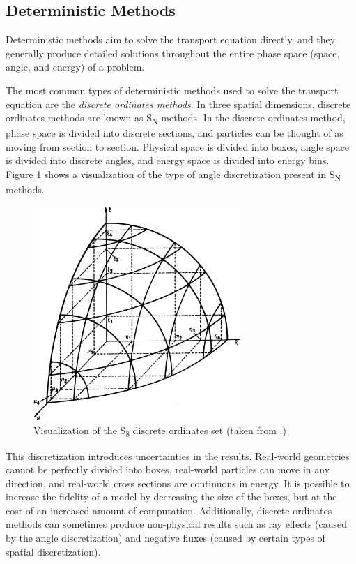\subsection{Deterministic Methods}
\label{sec:bg:rt:determ}

Deterministic methods aim to solve the transport equation directly, and they generally produce detailed solutions throughout the entire phase space (space, angle, and energy) of a problem.

The most common types of deterministic methods used to solve the transport equation are the \textit{discrete ordinates methods}.
In three spatial dimensions, discrete ordinates methods are known as S\textsubscript{N} methods.
In the discrete ordinates method, phase space is divided into discrete sections, and particles can be thought of as moving from section to section.
Physical space is divided into boxes, angle space is divided into discrete angles, and energy space is divided into energy bins.
Figure \ref{fig:bg:discrete-ordinates} shows a visualization of the type of angle discretization present in S\textsubscript{N} methods.

\begin{figure}[h!]
  \centering
  \includegraphics[width=0.7\textwidth]{content/background/discrete_ordinates.png}
  \caption{Visualization of the S\textsubscript{8} discrete ordinates set (taken from \cite{lewis_miller}.)}
  \label{fig:bg:discrete-ordinates}
\end{figure}

This discretization introduces uncertainties in the results.
Real-world geometries cannot be perfectly divided into boxes, real-world particles can move in any direction, and real-world cross sections are continuous in energy.
It is possible to increase the fidelity of a model by decreasing the size of the boxes, but at the cost of an increased amount of computation.
Additionally, discrete ordinates methods can sometimes produce non-physical results such as ray effects (caused by the angle discretization) and negative fluxes (caused by certain types of spatial discretization).

